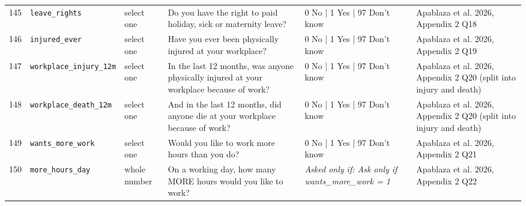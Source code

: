 \documentclass[9pt,a4paper,landscape]{article}
\begin{document}
\begin{longtable}{@{}p{0.5cm}p{3.3cm}p{1.7cm}p{7.3cm}p{5.6cm}p{5.4cm}@{}}
\footnotesize 145 & \footnotesize\texttt{leave\_rights} & \scriptsize select one & \footnotesize Do you have the right to paid holiday, sick or maternity leave?\par\vspace{1pt}{\footnotesize\color{hdr}{\hifont क्या आपको पैसे वाली छुट्टी मिलती है — त्योहार, बीमारी या ज़च्चगी की?}} & \scriptsize 0 No | 1 Yes | 97 Don't know & \scriptsize Apablaza et al. 2026, Appendix 2 Q18\\
\footnotesize 146 & \footnotesize\texttt{injured\_ever} & \scriptsize select one & \footnotesize Have you ever been physically injured at your workplace?\par\vspace{1pt}{\footnotesize\color{hdr}{\hifont क्या आपको कभी काम की जगह पर चोट लगी है?}} & \scriptsize 0 No | 1 Yes | 97 Don't know & \scriptsize Apablaza et al. 2026, Appendix 2 Q19\\
\footnotesize 147 & \footnotesize\texttt{workplace\_injury\_12m} & \scriptsize select one & \footnotesize In the last 12 months, was anyone physically injured at your workplace because of work?\par\vspace{1pt}{\footnotesize\color{hdr}{\hifont पिछले 12 महीनों में क्या आपके काम की जगह पर काम की वजह से किसी को चोट लगी?}} & \scriptsize 0 No | 1 Yes | 97 Don't know & \scriptsize Apablaza et al. 2026, Appendix 2 Q20 (split into injury and death)\\
\footnotesize 148 & \footnotesize\texttt{workplace\_death\_12m} & \scriptsize select one & \footnotesize And in the last 12 months, did anyone die at your workplace because of work?\par\vspace{1pt}{\footnotesize\color{hdr}{\hifont और पिछले 12 महीनों में, क्या आपके काम की जगह पर काम की वजह से किसी की मौत हुई?}} & \scriptsize 0 No | 1 Yes | 97 Don't know & \scriptsize Apablaza et al. 2026, Appendix 2 Q20 (split into injury and death)\\
\footnotesize 149 & \footnotesize\texttt{wants\_more\_work} & \scriptsize select one & \footnotesize Would you like to work more hours than you do?\par\vspace{1pt}{\footnotesize\color{hdr}{\hifont क्या आप अभी से ज़्यादा घंटे काम करना चाहेंगे?}} & \scriptsize 0 No | 1 Yes | 97 Don't know & \scriptsize Apablaza et al. 2026, Appendix 2 Q21\\
\footnotesize 150 & \footnotesize\texttt{more\_hours\_day} & \scriptsize whole number & \footnotesize On a working day, how many MORE hours would you like to work?\par\vspace{1pt}{\footnotesize\color{hdr}{\hifont काम के दिन में आप कितने घंटे और काम करना चाहेंगे?}} & \scriptsize \textit{Asked only if: Ask only if wants\_more\_work = 1} & \scriptsize Apablaza et al. 2026, Appendix 2 Q22\\

\end{longtable}
\end{document}
